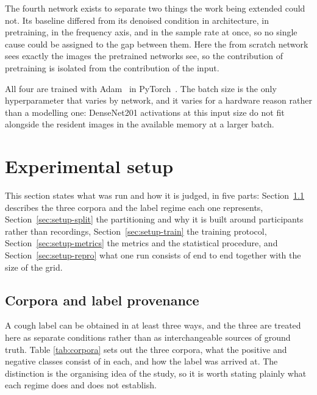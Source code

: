 \documentclass[pdflatex,sn-mathphys-num]{sn-jnl}
\begin{document}
The fourth network exists to separate two things the work being extended could not. Its
baseline differed from its denoised condition in architecture, in pretraining, in the
frequency axis, and in the sample rate at once, so no single cause could be assigned to
the gap between them. Here the from scratch network sees exactly the images the
pretrained networks see, so the contribution of pretraining is isolated from the
contribution of the input.

All four are trained with Adam~\cite{kingma2015} in PyTorch~\cite{paszke2019}. The batch
size is the only hyperparameter that varies by network, and it varies for a hardware
reason rather than a modelling one: DenseNet201 activations at this input size do not fit
alongside the resident images in the available memory at a larger batch.

\section{Experimental setup}\label{sec:setup}

This section states what was run and how it is judged, in five parts:
Section~\ref{sec:setup-corpora} describes the three corpora and the label regime each
one represents, Section~\ref{sec:setup-split} the partitioning and why it is built around
participants rather than recordings, Section~\ref{sec:setup-train} the training protocol,
Section~\ref{sec:setup-metrics} the metrics and the statistical procedure, and
Section~\ref{sec:setup-repro} what one run consists of end to end together with the size
of the grid.

\subsection{Corpora and label provenance}\label{sec:setup-corpora}

A cough label can be obtained in at least three ways, and the three are treated here as
separate conditions rather than as interchangeable sources of ground truth. Table
\ref{tab:corpora} sets out the three corpora, what the positive and negative classes
consist of in each, and how the label was arrived at. The distinction is the organising
idea of the study, so it is worth stating plainly what each regime does and does not
establish.
\end{document}

